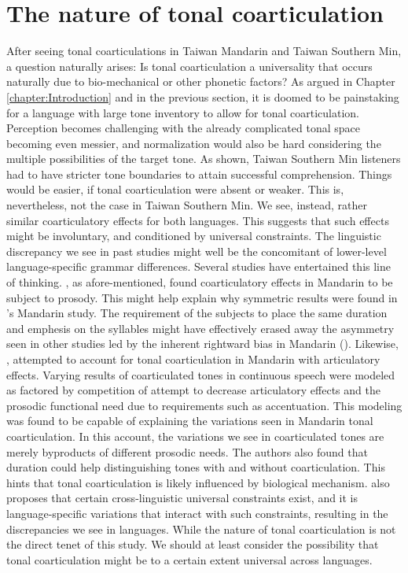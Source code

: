 \section{The nature of tonal coarticulation}
After seeing tonal coarticulations in Taiwan Mandarin and Taiwan Southern Min, a question naturally arises: Is tonal coarticulation a universality that occurs naturally due to bio-mechanical or other phonetic factors? As argued in Chapter \ref{chapter:Introduction} and in the previous section, it is doomed to be painstaking for a language with large tone inventory to allow for tonal coarticulation. Perception becomes challenging with the already complicated tonal space becoming even messier, and normalization would also be hard considering the multiple possibilities of the target tone. As shown, Taiwan Southern Min listeners had to have stricter tone boundaries to attain successful comprehension. Things would be easier, if tonal coarticulation were absent or weaker. This is, nevertheless, not the case in Taiwan Southern Min. We see, instead, rather similar coarticulatory effects for both languages. This suggests that such effects might be involuntary, and conditioned by universal constraints. The linguistic discrepancy we see in past studies might well be the concomitant of lower-level language-specific grammar differences. Several studies have entertained this line of thinking. \cite{ShihSproat1992}, as afore-mentioned, found coarticulatory effects in Mandarin to be subject to prosody. This might help explain why symmetric results were found in \cite{Shen1990}'s Mandarin study. The requirement of the subjects to place the same duration and emphesis on the syllables might have effectively erased away the asymmetry seen in other studies led by the inherent rightward bias in Mandarin (\citealp{Hyman2007}). Likewise, \cite{Haoetal2018}, attempted to account for tonal coarticulation in Mandarin with articulatory effects. Varying results of coarticulated tones in continuous speech were modeled as factored by competition of attempt to decrease articulatory effects and the prosodic functional need due to requirements such as accentuation. This modeling was found to be capable of explaining the variations seen in Mandarin tonal coarticulation. In this account, the variations we see in coarticulated tones are merely byproducts of different prosodic needs. The authors also found that duration could help distinguishing tones with and without coarticulation. This hints that tonal coarticulation is likely influenced by biological mechanism. \cite{Flemming2011} also proposes that certain cross-linguistic universal constraints exist, and it is language-specific variations that interact with such constraints, resulting in the discrepancies we see in languages. While the nature of tonal coarticulation is not the direct tenet of this study. We should at least consider the possibility that tonal coarticulation might be to a certain extent universal across languages.

